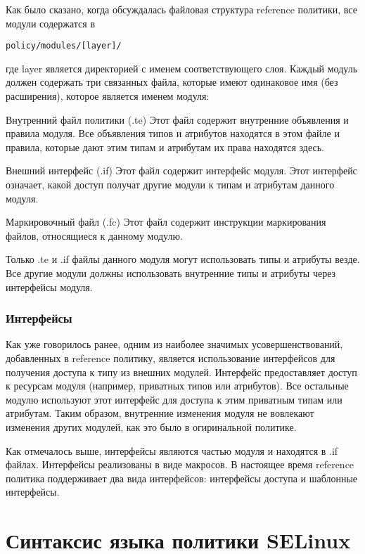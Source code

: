\documentclass{./../class/UIR}
\begin{document}
	Как было сказано, когда обсуждалась файловая структура reference политики, все
	модули содержатся в \begin{verbatim}policy/modules/[layer]/\end{verbatim} где
	layer является директорией с именем соответствующего слоя. Каждый модуль должен
	содержать три связанных файла, которые имеют одинаковое имя (без расширения),
	которое является именем модуля:

    \begin{description}
      \item Внутренний файл политики (.te) Этот файл содержит внутренние объявления
      и правила модуля. Все объявления типов и атрибутов находятся в этом файле и
      правила, которые дают этим типам и атрибутам их права находятся здесь.
      \item Внешний интерфейс (.if) Этот файл содержит интерфейс модуля. Этот
      интерфейс означает, какой доступ получат другие модули к типам и атрибутам
      данного модуля.
      \item Маркировочный файл (.fc) Этот файл содержит инструкции маркирования
      файлов, относящиеся к данному модулю.
    \end{description}

    Только .te и .if файлы данного модуля могут использовать типы и атрибуты везде.
    Все другие модули должны использовать внутренние типы и атрибуты через
    интерфейсы модуля.

\subsubsection{Интерфейсы}
	Как уже говорилось ранее, одним из наиболее значимых усовершенствований,
	добавленных в reference политику, является использование интерфейсов для
	получения доступа к типу из внешних модулей. Интерфейс предоставляет доступ к
	ресурсам модуля (например, приватных типов или атрибутов). Все остальные
	модулю используют этот интерфейс для доступа к этим приватным типам или
	атрибутам. Таким образом, внутренние изменения модуля не вовлекают изменения
	других модулей, как это было в огиринальной политике.
	
	Как отмечалось выше, интерфейсы являются частью модуля и находятся в .if
	файлах. Интерфейсы реализованы в виде макросов. В настоящее время reference
	политика поддерживает два вида интерфейсов: интерфейсы доступа и шаблонные
	интерфейсы.

\section{Синтаксис языка политики SELinux}
\end{document}
